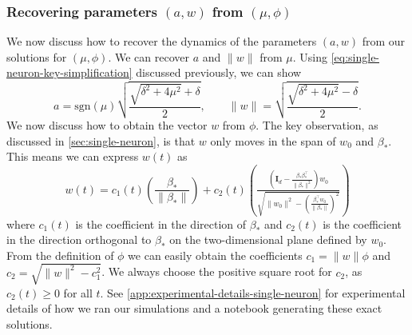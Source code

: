 \documentclass{article}
\theoremstyle{plain}
\theoremstyle{definition}
\theoremstyle{remark}
\begin{document}
\subsubsection{Recovering parameters \texorpdfstring{$(a, w)$}{} from \texorpdfstring{$(\mu, \phi)$}{}}
\label{app:single-neuron-a-w-from-mu-phi}

We now discuss how to recover the dynamics of the parameters $(a, w)$ from our solutions for $(\mu, \phi)$.
%
We can recover $a$ and $\|w\|$ from $\mu$.
%
Using \cref{eq:single-neuron-key-simplification} discussed previously, we can show
%
\begin{equation}
    a = \mathrm{sgn}(\mu)\sqrt{\frac{\sqrt{\delta^2 + 4\mu^2} + \delta}{2}}, \qquad \|w\| = \sqrt{\frac{\sqrt{\delta^2 + 4\mu^2} - \delta}{2}}.
\end{equation}
%
We now discuss how to obtain the vector $w$ from $\phi$. 
%
The key observation, as discussed in \cref{sec:single-neuron}, is that $w$ only moves in the span of $w_0$ and $\beta_*$. This means we can express $w(t)$ as 
\begin{equation}
    w(t) = c_1(t)\left(\frac{\beta_*}{\|\beta_*\|}\right) + c_2(t) \left(\tfrac{\left(\mathbf{I}_d - \frac{\beta_*\beta_*^\intercal}{\|\beta_*\|^2}\right)w_0}{\sqrt{\|w_0\|^2-\left(\frac{\beta_*^\intercal w_0}{\|\beta_*\|}\right)^2}}\right)
\end{equation}
where $c_1(t)$ is the coefficient in the direction of $\beta_*$ and $c_2(t)$ is the coefficient in the direction orthogonal to $\beta_*$ on the two-dimensional plane defined by $w_0$.
%
From the definition of $\phi$ we can easily obtain the coefficients $ c_1 = \|w\|\phi$ and $c_2 = \sqrt{\|w\|^2-c_1^2}$.
%
We always choose the positive square root for $c_2$, as $c_2(t) \ge 0$ for all $t$. 
%
See \cref{app:experimental-details-single-neuron} for experimental details of how we ran our simulations and a notebook generating these exact solutions.
\end{document}
